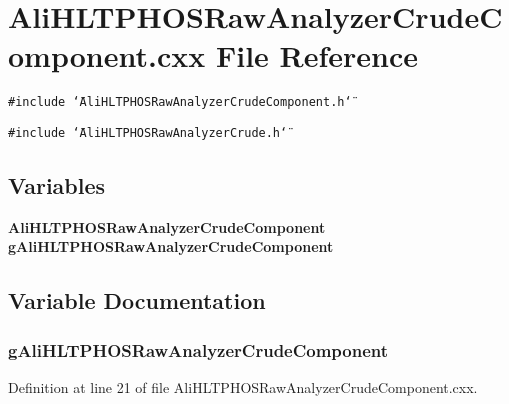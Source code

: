 \section{Ali\-HLTPHOSRaw\-Analyzer\-Crude\-Component.cxx File Reference}
\label{AliHLTPHOSRawAnalyzerCrudeComponent_8cxx}


{\tt \#include \char`\"{}Ali\-HLTPHOSRaw\-Analyzer\-Crude\-Component.h\char`\"{}}\par
{\tt \#include \char`\"{}Ali\-HLTPHOSRaw\-Analyzer\-Crude.h\char`\"{}}\par
\subsection*{Variables}
\begin{CompactItemize}
\item 
{\bf Ali\-HLTPHOSRaw\-Analyzer\-Crude\-Component} {\bf g\-Ali\-HLTPHOSRaw\-Analyzer\-Crude\-Component}
\end{CompactItemize}


\subsection{Variable Documentation}
\subsubsection{ {\bf g\-Ali\-HLTPHOSRaw\-Analyzer\-Crude\-Component}}\label{AliHLTPHOSRawAnalyzerCrudeComponent_8cxx_a0}




Definition at line 21 of file Ali\-HLTPHOSRaw\-Analyzer\-Crude\-Component.cxx.
